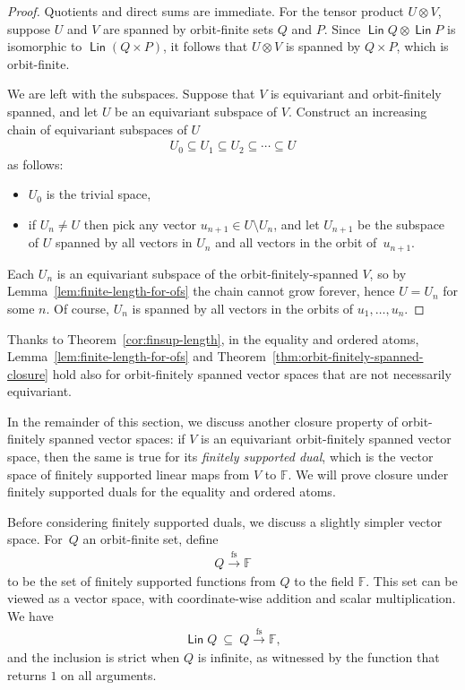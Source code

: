 \documentclass[10pt,a4paper]{amsart}
\numberwithin{equation}{section}
\DeclareMathOperator{\lin}{\mathsf{Lin}}
\newcommand{\field}{\mathbb F}
\newcommand{\finsup}{\stackrel{\mathrm{fs}}{\to}}
\newcommand{\forms}[1]{#1 \finsup \field}
\begin{document}
\begin{proof}
   Quotients and direct sums are immediate.  For the tensor product $U \otimes V$, suppose $U$ and $V$ are spanned by orbit-finite sets $Q$ and $P$.
   Since  $\lin Q \otimes \lin P$ is isomorphic to $\lin (Q \times P)$, it follows that  $U \otimes V$ is spanned by $Q \times P$, which is orbit-finite. 
   
   We are left with the subspaces. Suppose that $V$ is equivariant and orbit-finitely spanned, and let $U$ be an equivariant subspace of $V$. Construct an increasing chain of equivariant subspaces of $U$ \begin{align*}
    U_0\subseteq U_1 \subseteq U_2 \subseteq \cdots \subseteq U
    \end{align*} 
as follows:
\begin{itemize}
\item $U_0$ is the trivial space,
\item if $U_n\neq U$ then pick any vector $u_{n+1}\in U\setminus U_n$, and let $U_{n+1}$ be the subspace of $U$ spanned by all vectors in $U_n$ and all vectors in the orbit of~$u_{n+1}$.
\end{itemize}   
Each $U_n$ is an equivariant subspace of the orbit-finitely-spanned $V$, so by Lemma~\ref{lem:finite-length-for-ofs} the chain cannot grow forever, hence $U=U_n$ for some $n$. Of course, $U_n$ is spanned by all vectors in the orbits of $u_1,\ldots,u_n$.
\end{proof}

Thanks to Theorem~\ref{cor:finsup-length}, in the equality and ordered atoms,  Lemma~\ref{lem:finite-length-for-ofs} and Theorem~\ref{thm:orbit-finitely-spanned-closure} hold also for orbit-finitely spanned vector spaces that are  not necessarily equivariant.

In the remainder of this section, we discuss another closure property of orbit-finitely spanned vector spaces: if $V$ is an equivariant orbit-finitely spanned vector space, then the same is true for its \emph{finitely supported dual}, which is the vector space of finitely supported linear maps from $V$ to $\field$. We will prove closure under finitely supported duals for the equality and ordered atoms.

Before considering finitely supported duals, we discuss a slightly simpler vector space.
For~$Q$ an orbit-finite set, define 
\begin{align*}
\forms Q
\end{align*}
to be the set of finitely supported functions from $Q$ to the field $\field$. This set can be viewed as a vector space, with coordinate-wise addition and scalar multiplication.  We have
\begin{align*}
\lin Q\   \subseteq \   \forms Q,
\end{align*}
and the inclusion is strict when $Q$ is infinite, as witnessed by the function that returns $1$ on all arguments. 
\end{document}
